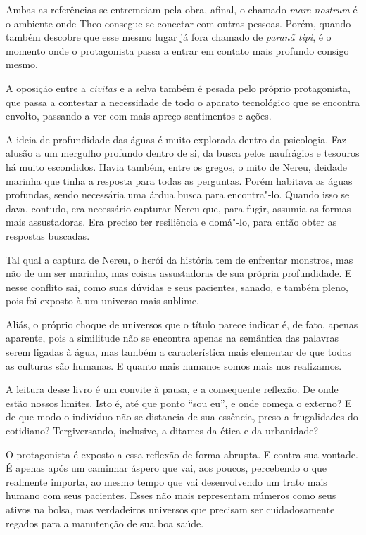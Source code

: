 Ambas as referências se entremeiam pela obra, afinal, o chamado \textit{mare
nostrum} é o ambiente onde Theo consegue se conectar com outras pessoas.
Porém, quando também descobre que esse mesmo lugar já fora chamado de
\textit{paranã tipi}, é o momento onde o protagonista passa a entrar em contato
mais profundo consigo mesmo.

A oposição entre a \textit{civitas} e a selva também é pesada pelo próprio
protagonista, que passa a contestar a necessidade de todo o aparato
tecnológico que se encontra envolto, passando a ver com mais apreço
sentimentos e ações.

A ideia de profundidade das águas é muito explorada dentro da
psicologia. Faz alusão a um mergulho profundo dentro de si, da busca
pelos naufrágios e tesouros há muito escondidos. Havia também, entre os
gregos, o mito de Nereu, deidade marinha que tinha a resposta para todas
as perguntas. Porém habitava as águas profundas, sendo necessária uma
árdua busca para encontra"-lo. Quando isso se dava, contudo, era
necessário capturar Nereu que, para fugir, assumia as formas mais
assustadoras. Era preciso ter resiliência e domá"-lo, para então obter as
respostas buscadas.

Tal qual a captura de Nereu, o herói da história tem de enfrentar
monstros, mas não de um ser marinho, mas coisas assustadoras de sua
própria profundidade. E nesse conflito sai, como suas dúvidas e seus
pacientes, sanado, e também pleno, pois foi exposto à um universo mais
sublime.

Aliás, o próprio choque de universos que o título parece indicar é, de
fato, apenas aparente, pois a similitude não se encontra apenas na
semântica das palavras serem ligadas à água, mas também a característica
mais elementar de que todas as culturas são humanas. E quanto mais
humanos somos mais nos realizamos.

A leitura desse livro é um convite à pausa, e a consequente reflexão. De
onde estão nossos limites. Isto é, até que ponto ``sou eu'', e onde
começa o externo? E de que modo o indivíduo não se distancia de sua
essência, preso a frugalidades do cotidiano? Tergiversando, inclusive, a
ditames da ética e da urbanidade?

O protagonista é exposto a essa reflexão de forma abrupta. E contra sua
vontade. É apenas após um caminhar áspero que vai, aos poucos,
percebendo o que realmente importa, ao mesmo tempo que vai desenvolvendo
um trato mais humano com seus pacientes. Esses não mais representam
números como seus ativos na bolsa, mas verdadeiros universos que
precisam ser cuidadosamente regados para a manutenção de sua boa saúde.

